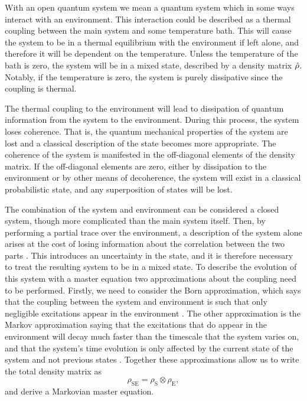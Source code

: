 With an open quantum system we mean a quantum system which in some ways interact with an environment. This interaction could be described as a thermal coupling between the main system and some temperature bath. This will cause the system to be in a thermal equilibrium with the environment if left alone, and therefore it will be dependent on the temperature. Unless the temperature of the bath is zero, the system will be in a mixed state, described by a density matrix $\hat{\rho}$. Notably, if the temperature is zero, the system is purely dissipative since the coupling is thermal. \cite{Annby-Andersson:2024}

The thermal coupling to the environment will lead to dissipation of quantum information from the system to the environment. During this process, the system loses coherence. That is, the quantum mechanical properties of the system are lost and a classical description of the state becomes more appropriate. The coherence of the system is manifested in the off-diagonal elements of the density matrix. If the off-diagonal elements are zero, either by dissipation to the environment or by other means of decoherence, the system will exist in a classical probabilistic state, and any superposition of states will be lost. \cite{Annby-Andersson:2024}

The combination of the system and environment can be considered a closed system, though more complicated than the main system itself. Then, by performing a partial trace over the environment, a description of the system alone arises at the cost of losing information about the correlation between the two parts \cite{Annby-Andersson:2024}. This introduces an uncertainty in the state, and it is therefore necessary to treat the resulting system to be in a mixed state. To describe the evolution of this system with a master equation two approximations about the coupling need to be performed. Firstly, we need to consider the Born approximation, which says that the coupling between the system and environment is such that only negligible excitations appear in the environment \cite{Breuer:2007}. The other approximation is the Markov approximation saying that the excitations that do appear in the environment will decay much faster than the timescale that the system varies on, and that the system's time evolution is only affected by the current state of the system and not previous states \cite{Breuer:2007}. Together these approximations allow us to write the total density matrix as 
\begin{equation}
    \rho_\mathrm{SE} = \rho_\mathrm{S} \otimes \rho_\mathrm{E},
\end{equation}
and derive a Markovian master equation.

